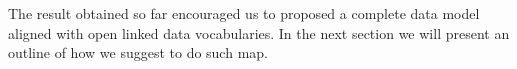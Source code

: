 

The result obtained so far encouraged us to proposed a complete data
model aligned with open linked data vocabularies. In the next section
we will present an outline of how we suggest to do such map.



